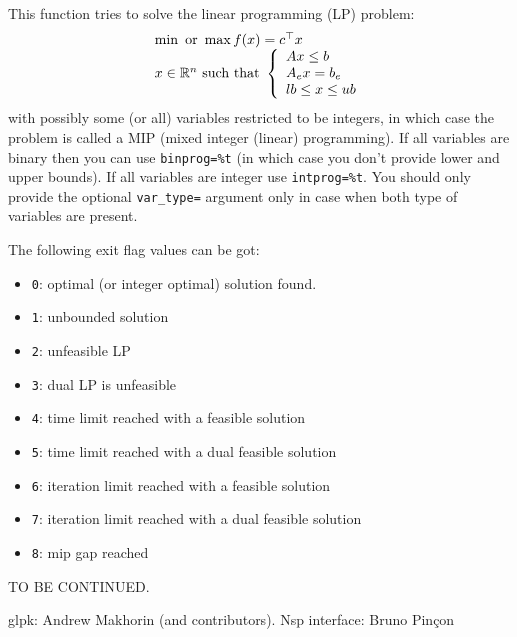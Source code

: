 \begin{mandescription}
This function tries to solve the linear programming (LP) problem:
$$
\begin{array}{l}
\min \mbox{ or } \max f(x) = c^{\top} x\\
x \in \mathbb R^n \mbox{ such that } \left\{ \begin{array}{l} 
  A x \le b \\
  A_e x = b_e \\
  lb \le x \le ub 
\end{array}\right.
\end{array}
$$
with possibly some (or all) variables restricted to be integers, in which
case the problem is called a MIP (mixed integer (linear) programming).
If all variables are binary then you can use \verb+binprog=%t+ (in which case
you don't provide lower and upper bounds). If all variables are 
integer use \verb+intprog=%t+. You should only provide the optional
\verb+var_type=+ argument only in case when both type of variables are
present. 

The following exit flag values can be got:
\begin{itemize}
\item \verb+0+: optimal (or integer optimal) solution found.
\item \verb+1+: unbounded solution
\item \verb+2+: unfeasible LP
\item \verb+3+: dual LP is unfeasible
\item \verb+4+: time limit reached with a feasible solution
\item \verb+5+: time limit reached with a dual feasible solution
\item \verb+6+: iteration limit reached with a feasible solution
\item \verb+7+: iteration limit reached with a dual feasible solution
\item \verb+8+: mip gap reached
\end{itemize}

TO BE CONTINUED.

\end{mandescription} 

\begin{examples}
  
\end{examples}

\begin{manseealso}

\end{manseealso}

\begin{authors}
 glpk: Andrew Makhorin (and contributors). Nsp interface: Bruno Pin\c{c}on
\end{authors}
